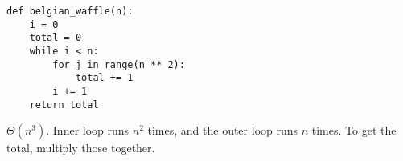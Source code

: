 \begin{blocksection}
\question \begin{lstlisting}
def belgian_waffle(n):
    i = 0
    total = 0
    while i < n:
        for j in range(n ** 2):
            total += 1
        i += 1
    return total
\end{lstlisting}

\begin{solution}
$\Theta(n^3)$. Inner loop runs $n^2$ times, and the outer loop runs $n$ times. To get the total, multiply those together.
\end{solution}
\end{blocksection}
